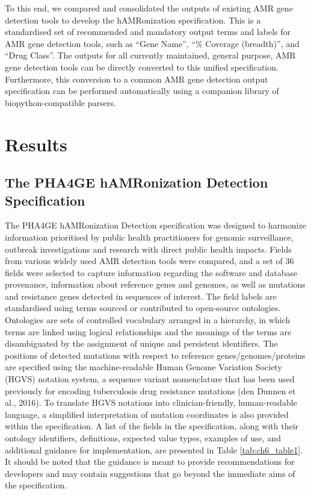 To this end, we compared and consolidated the outputs of existing AMR gene detection tools to develop the hAMRonization specification. This is a standardised set of recommended and mandatory output terms and labels for AMR gene detection tools, such as “Gene Name”, “\% Coverage (breadth)”, and “Drug Class”.  The outputs for all currently maintained, general purpose, AMR gene detection tools can be directly converted to this unified specification.  Furthermore, this conversion to a common AMR gene detection output specification can be performed automatically using a companion library of  biopython-compatible parsers.

\section{Results}

\subsection{The PHA4GE hAMRonization Detection Specification}

The PHA4GE hAMRonization Detection specification was designed to harmonize information prioritised by public health practitioners for genomic surveillance, outbreak investigations and research with direct public health impacts. Fields from various widely used AMR detection tools were compared, and a set of 36 fields were selected to capture information regarding the software and database provenance, information about reference genes and genomes, as well as mutations and resistance genes detected in sequences of interest. The field labels are standardised using terms sourced or contributed to open-source ontologies. Ontologies are sets of controlled vocabulary arranged in a hierarchy, in which terms are linked using logical relationships and the meanings of the terms are disambiguated by the assignment of unique and persistent identifiers. The positions of detected mutations with respect to reference genes/genomes/proteins are specified using the machine-readable Human Genome Variation Society (HGVS) notation system, a sequence variant nomenclature that has been used previously for encoding tuberculosis drug resistance mutations (den Dunnen et al., 2016). To translate HGVS notations into clinician-friendly, human-readable language, a simplified interpretation of mutation coordinates is also provided within the specification. A list of the fields in the specification, along with their ontology identifiers, definitions, expected value types, examples of use, and additional guidance for implementation, are presented in Table \ref{tab:ch6_table1}. It should be noted that the guidance is meant to provide recommendations for developers and may contain suggestions that go beyond the immediate aims of the specification.

